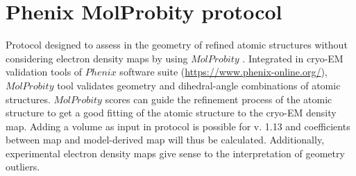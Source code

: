 \section{Phenix MolProbity protocol}
\label{app:molprobityProtocol}%
Protocol designed to assess in \scipion the geometry of refined atomic structures without considering electron density maps by using $MolProbity$ \citep{davis2004}. Integrated in cryo-EM validation tools of $Phenix$ software suite (\url{https://www.phenix-online.org/}), $MolProbity$ tool validates geometry and dihedral-angle combinations of atomic structures. $MolProbity$ scores can guide the refinement process of the atomic structure to get a good fitting of the atomic structure to the cryo-EM density map. Adding a volume as input in  protocol is possible for \phenix v. 1.13 and  coefficients between map and model-derived map will thus be calculated. Additionally, experimental electron density maps give sense to the interpretation of geometry outliers.

